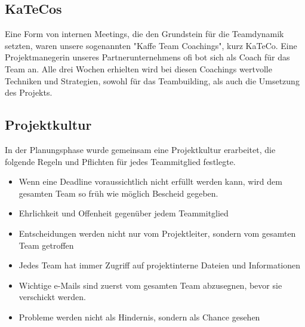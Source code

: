  \subsection{KaTeCos}
  Eine Form von internen Meetings, die den Grundstein für die Teamdynamik setzten, waren unsere
  sogenannten "Kaffe Team Coachings", kurz KaTeCo. Eine Projektmanegerin unseres Partnerunternehmens ofi
  bot sich als Coach für das Team an. Alle drei Wochen erhielten wird bei diesen Coachings wertvolle Techniken und
  Strategien, sowohl für das Teambuilding, als auch die Umsetzung des Projekts.

  \subsection{Projektkultur}
  In der Planungsphase wurde gemeinsam eine Projektkultur erarbeitet, die folgende Regeln und Pflichten
  für jedes Teammitglied festlegte.
  \begin{itemize}
    \item Wenn eine Deadline voraussichtlich nicht erfüllt werden kann, wird dem gesamten Team so früh wie möglich Bescheid gegeben.
    \item Ehrlichkeit und Offenheit gegenüber jedem Teammitglied
    \item Entscheidungen werden nicht nur vom Projektleiter, sondern vom gesamten Team getroffen
    \item Jedes Team hat immer Zugriff auf projektinterne Dateien und Informationen
    \item Wichtige e-Mails sind zuerst vom gesamten Team abzusegnen, bevor sie verschickt werden.
    \item Probleme werden nicht als Hindernis, sondern als Chance gesehen
  \end{itemize}
